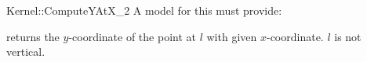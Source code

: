 \begin{ccRefFunctionObjectConcept}{Kernel::ComputeYAtX_2}
A model for this must provide:


       {returns the $y$-coordinate of the point at $l$ with
        given $x$-coordinate.
        \ccPrecond $l$ is not vertical.}

\ccRefines
{}

\ccSeeAlso
{} \\

\end{ccRefFunctionObjectConcept}
